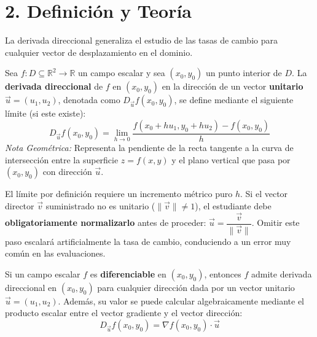 \documentclass[11pt]{article}
\newenvironment{teoria}{%
  \section*{2. Definición y Teoría}%
}{}
\newenvironment{definicion}[1]{%
  \begin{tcolorbox}[colback=blue!5,colframe=blue!75!black,title=Definición: #1]%
}{%
  \end{tcolorbox}%
}
\newenvironment{teorema}[1]{%
  \begin{tcolorbox}[colback=green!5,colframe=green!75!black,title=Teorema: #1]%
}{%
  \end{tcolorbox}%
}
\newenvironment{alerta}[1]{%
  \begin{tcolorbox}[colback=red!5,colframe=red!80!black,title=Advertencia Metodológica: #1]%
}{%
  \end{tcolorbox}%
}
\begin{document}
\begin{teoria}
  
  La derivada direccional generaliza el estudio de las tasas de cambio para cualquier vector de desplazamiento en el dominio.

  \begin{definicion}{Derivada Direccional}
    Sea $f \colon D \subseteq \mathbb{R}^2 \to \mathbb{R}$ un campo escalar y sea $(x_0, y_0)$ un punto interior de $D$. La \textbf{derivada direccional} de $f$ en $(x_0, y_0)$ en la dirección de un vector \textbf{unitario} $\vec{u} = (u_1, u_2)$, denotada como $D_{\vec{u}}f(x_0, y_0)$, se define mediante el siguiente límite (si este existe):
    $$ D_{\vec{u}}f(x_0, y_0) = \lim\limits_{h \to 0} \dfrac{f(x_0 + h u_1, y_0 + h u_2) - f(x_0, y_0)}{h} $$
    \textit{Nota Geométrica:} Representa la pendiente de la recta tangente a la curva de intersección entre la superficie $z = f(x,y)$ y el plano vertical que pasa por $(x_0, y_0)$ con dirección $\vec{u}$.
  \end{definicion}

  \begin{alerta}{El Vector debe ser Unitario}
    El límite por definición requiere un incremento métrico puro $h$. Si el vector director $\vec{v}$ suministrado no es unitario ($\|\vec{v}\| \neq 1$), el estudiante debe \textbf{obligatoriamente normalizarlo} antes de proceder: $\vec{u} = \dfrac{\vec{v}}{\|\vec{v}\|}$. Omitir este paso escalará artificialmente la tasa de cambio, conduciendo a un error muy común en las evaluaciones.
  \end{alerta}

  \begin{teorema}{Cálculo Operativo de la Derivada Direccional}
    Si un campo escalar $f$ es \textbf{diferenciable} en $(x_0, y_0)$, entonces $f$ admite derivada direccional en $(x_0, y_0)$ para cualquier dirección dada por un vector unitario $\vec{u} = (u_1, u_2)$. Además, su valor se puede calcular algebraicamente mediante el producto escalar entre el vector gradiente y el vector dirección:
    $$ D_{\vec{u}}f(x_0, y_0) = \nabla f(x_0, y_0) \cdot \vec{u} $$
  \end{teorema}


\end{teoria}
\end{document}
